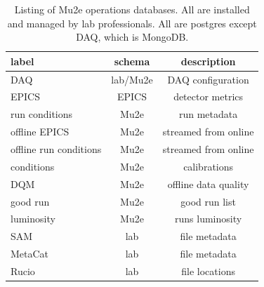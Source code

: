 \begin{table}[ht!]
\begin{center}
\begin{tabular}{ |l |c | c| }
\hline
label & schema & description \\ \hline
 DAQ & lab/Mu2e & DAQ configuration \\  
 EPICS & EPICS & detector metrics \\   
 run conditions & Mu2e & run metadata \\  
 offline EPICS & Mu2e & streamed from online \\  
 offline run conditions & Mu2e & streamed from online \\  
 conditions & Mu2e & calibrations \\
 DQM & Mu2e & offline data quality \\
 good run & Mu2e & good run list \\
 luminosity & Mu2e & runs luminosity \\
 SAM & lab & file metadata \\
 MetaCat & lab & file metadata \\
 Rucio & lab & file locations \\ \hline
\end{tabular}
\end{center}
\caption{Listing of Mu2e operations databases.  All are installed and managed by lab professionals.  All are postgres except DAQ, which is MongoDB.}
\label{tab:db}
\end{table}




